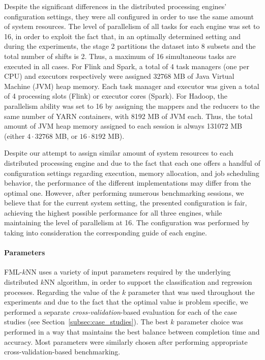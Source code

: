 Despite the significant differences in the distributed processing engines' configuration settings, they were all configured in order to use the same amount of system resources. The level of parallelism of all tasks for each engine was set to 16, in order to exploit the fact that, in an optimally determined setting and during the experiments, the stage 2 partitions the dataset into 8 subsets and the total number of shifts is 2. Thus, a maximum of 16 simultaneous tasks are executed in all cases. For Flink and Spark, a total of 4 task managers (one per CPU) and executors respectively were assigned 32768 MB of Java Virtual Machine (JVM) heap memory. Each task manager and executor was given a total of 4 processing slots (Flink) or executor cores (Spark). For Hadoop, the parallelism ability was set to 16 by assigning the mappers and the reducers to the same number of YARN containers, with 8192 MB of JVM each. Thus, the total amount of JVM heap memory assigned to each session is always 131072 MB (either $4 \cdot 32768$ MB, or $16 \cdot 8192$ MB).

Despite our attempt to assign similar amount of system resources to each distributed processing engine and due to the fact that each one offers a handful of configuration settings regarding execution, memory allocation, and job scheduling behavior, the performance of the different implementations may differ from the optimal one. However, after performing numerous benchmarking sessions, we believe that for the current system setting, the presented configuration is fair, achieving the highest possible performance for all three engines, while maintaining the level of parallelism at 16. The configuration was performed by taking into consideration the corresponding guide of each engine.

\paragraph{Parameters}
\label{par:Parameters}
FML-$k$NN uses a variety of input parameters required by the underlying distributed $k$NN algorithm, in order to support the classification and regression processes. Regarding the value of the $k$ parameter that was used throughout the experiments and due to the fact that the optimal value is problem specific, we performed a separate \textit{cross-validation}-based evaluation for each of the case studies (see Section~\ref{subsec:case_studies}). The best $k$ parameter choice was performed in a way that maintains the best balance between completion time and accuracy. Most parameters were similarly chosen after performing appropriate cross-validation-based benchmarking.

